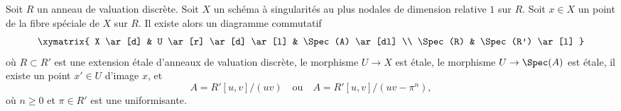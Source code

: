 \begin{lemma}
\label{lemma-etale-local-at-worst-nodal}
Soit $R$ un anneau de valuation discrète. Soit $X$ un schéma à singularités
au plus nodales de dimension relative $1$ sur $R$. Soit $x\in X$ un point
de la fibre spéciale de $X$ sur $R$. Il existe alors un diagramme commutatif
$$
\xymatrix{
X \ar[d] &
U \ar[r] \ar[d] \ar[l] &
\Spec(A) \ar[dl] \\
\Spec(R) &
\Spec(R') \ar[l]
}
$$
où $R\subset R'$ est une extension étale d'anneaux de valuation discrète,
le morphisme $U\to X$ est étale, le morphisme $U\to\Spec(A)$ est étale,
il existe un point $x'\in U$ d'image $x$, et
$$
A = R'[u, v]/(uv)
\quad\text{ou}\quad
A = R'[u, v]/(uv - \pi^n),
$$
où $n\geq0$ et $\pi\in R'$ est une uniformisante.
\end{lemma}

